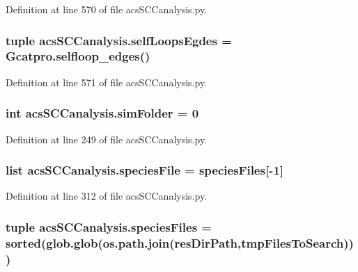 Definition at line 570 of file acs\-S\-C\-Canalysis.\-py.

\hypertarget{a00097_ad34596e89eef2cfb696f61a810765c7a}{
\subsubsection[{self\-Loops\-Egdes}]{\setlength{\rightskip}{0pt plus 5cm}tuple acs\-S\-C\-Canalysis.\-self\-Loops\-Egdes = Gcatpro.\-selfloop\-\_\-edges()}}\label{a00097_ad34596e89eef2cfb696f61a810765c7a}


Definition at line 571 of file acs\-S\-C\-Canalysis.\-py.

\hypertarget{a00097_a58095f64afeda893517e81226e1963c3}{
\subsubsection[{sim\-Folder}]{\setlength{\rightskip}{0pt plus 5cm}int acs\-S\-C\-Canalysis.\-sim\-Folder = 0}}\label{a00097_a58095f64afeda893517e81226e1963c3}


Definition at line 249 of file acs\-S\-C\-Canalysis.\-py.

\hypertarget{a00097_a1d066fa24dced2da12ffd9a8514a17ba}{
\subsubsection[{species\-File}]{\setlength{\rightskip}{0pt plus 5cm}list acs\-S\-C\-Canalysis.\-species\-File = {\bf species\-Files}\mbox{[}-\/1\mbox{]}}}\label{a00097_a1d066fa24dced2da12ffd9a8514a17ba}


Definition at line 312 of file acs\-S\-C\-Canalysis.\-py.

\hypertarget{a00097_a4f47408478e9a0590d016df50cf42141}{
\subsubsection[{species\-Files}]{\setlength{\rightskip}{0pt plus 5cm}tuple acs\-S\-C\-Canalysis.\-species\-Files = sorted(glob.\-glob(os.\-path.\-join({\bf res\-Dir\-Path},{\bf tmp\-Files\-To\-Search})))}}\label{a00097_a4f47408478e9a0590d016df50cf42141}


